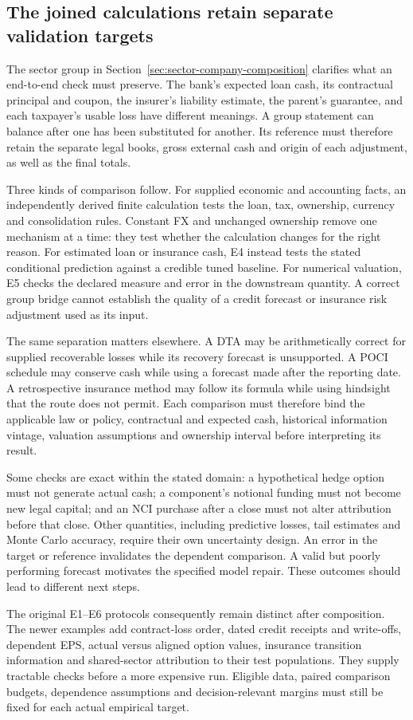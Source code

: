 \subsection{The joined calculations retain separate validation targets}
\label{sec:joined-validation-targets}

The sector group in Section~\ref{sec:sector-company-composition} clarifies what
an end-to-end check must preserve. The bank's expected loan cash, its contractual
principal and coupon, the insurer's liability estimate, the parent's guarantee,
and each taxpayer's usable loss have different meanings. A group statement
can balance after one has been substituted for another. Its reference must
therefore retain the separate legal books, gross external cash and origin of
each adjustment, as well as the final totals.

Three kinds of comparison follow. For supplied economic and accounting facts,
an independently derived finite calculation tests the loan, tax, ownership,
currency and consolidation rules. Constant FX and unchanged ownership remove
one mechanism at a time: they test whether the calculation changes for the
right reason. For estimated loan or insurance cash, E4 instead tests the stated
conditional prediction against a credible tuned baseline. For numerical
valuation, E5 checks the declared measure and error in the downstream quantity.
A correct group bridge cannot establish the quality of a credit forecast or
insurance risk adjustment used as its input.

The same separation matters elsewhere. A DTA may be arithmetically correct for
supplied recoverable losses while its recovery forecast is unsupported. A POCI
schedule may conserve cash while using a forecast made after the reporting
date. A retrospective insurance method may follow its formula while using
hindsight that the route does not permit. Each comparison must therefore bind
the applicable law or policy, contractual and expected cash, historical
information vintage, valuation assumptions and ownership interval before
interpreting its result.

Some checks are exact within the stated domain: a hypothetical hedge option
must not generate actual cash; a component's notional funding must not become
new legal capital; and an NCI purchase after a close must not alter attribution
before that close. Other quantities, including predictive losses, tail estimates
and Monte Carlo accuracy, require their own uncertainty design. An error in the
target or reference invalidates the dependent comparison. A valid but poorly
performing forecast motivates the specified model repair. These outcomes
should lead to different next steps.

The original E1--E6 protocols consequently remain distinct after composition.
The newer examples add contract-loss order, dated credit receipts and write-offs,
dependent EPS, actual versus aligned option values, insurance transition
information and shared-sector attribution to their test populations. They
supply tractable checks before a more expensive run. Eligible data, paired
comparison budgets, dependence assumptions and decision-relevant margins
must still be fixed for each actual empirical target.
